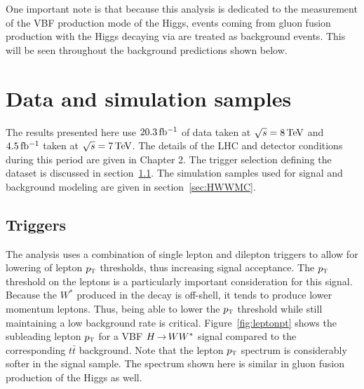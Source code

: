 One important note is that because this analysis is dedicated to the measurement of the VBF production mode of the Higgs, events coming from gluon fusion production with the Higgs decaying via \HWWfull are treated as background events. This will be seen throughout the background predictions shown below. 

 

\section{Data and simulation samples}

The results presented here use $20.3 \mbox{\,fb$^{-1}$}$ of data taken at $\sqrt{s} = 8 \TeV$ and $4.5 \mbox{\,fb$^{-1}$}$ taken at $\sqrt{s} = 7 \TeV$. The details of the LHC and detector conditions during this period are given in Chapter 2. The trigger selection defining the dataset is discussed in section~\ref{sec:HWWtrigger}. The simulation samples used for signal and background modeling are given in section~\ref{sec:HWWMC}.

\subsection{Triggers}
\label{sec:HWWtrigger}

The analysis uses a combination of single lepton and dilepton triggers to allow for lowering of lepton $p_{\textrm{\footnotesize\sc t}}$ thresholds, thus increasing signal acceptance. The $p_{\textrm{\footnotesize\sc t}}$ threshold on the leptons is a particularly important consideration for this signal. Because the $W^*$ produced in the decay is off-shell, it tends to produce lower momentum leptons. Thus, being able to lower the $p_{\textrm{\footnotesize\sc t}}$ threshold while still maintaining a low background rate is critical. Figure~\ref{fig:leptonpt} shows the subleading lepton $p_{\textrm{\footnotesize\sc t}}$ for a VBF $H{\,{\rightarrow}\,}WW^\ast$ signal compared to the corresponding $t\bar{t}$ background. Note that the lepton $p_{\textrm{\footnotesize\sc t}}$ spectrum is considerably softer in the signal sample. The spectrum shown here is similar in gluon fusion production of the Higgs as well. 

